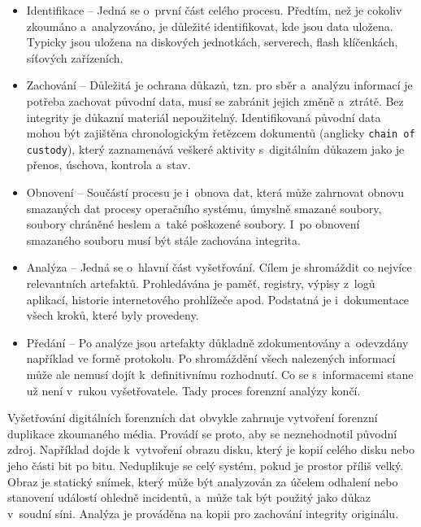 \begin{itemize}
\item Identifikace -- Jedná se o~první část celého procesu. Předtím, než je cokoliv zkoumáno a~analyzováno, je důležité identifikovat, kde jsou data uložena. Typicky jsou uložena na diskových jednotkách, serverech, flash klíčenkách, síťových zařízeních.

\item Zachování -- Důležitá je ochrana důkazů, tzn. pro sběr a~analýzu informací je potřeba zachovat původní data, musí se zabránit jejich změně a~ztrátě. Bez integrity je důkazní materiál nepoužitelný. Identifikovaná původní data mohou být zajištěna chronologickým řetězcem dokumentů (anglicky \texttt{chain of custody}), který zaznamenává veškeré aktivity s~digitálním důkazem jako je přenos, úschova, kontrola a~stav.

\item Obnovení -- Součástí procesu je i~obnova dat, která může zahrnovat obnovu smazaných dat procesy operačního systému, úmyslně smazané soubory, soubory chráněné heslem a~také poškozené soubory. I~po obnovení smazaného souboru musí být stále zachována integrita.

\item Analýza -- Jedná se o~hlavní část vyšetřování. Cílem je shromáždit co nejvíce relevantních artefaktů. Prohledávána je paměť, registry, výpisy z~logů aplikací, historie internetového prohlížeče apod. Podstatná je i~dokumentace všech kroků, které byly provedeny.

\item Předání -- Po analýze jsou artefakty důkladně zdokumentovány a~odevzdány například ve formě protokolu. Po shromáždění všech nalezených informací může ale nemusí dojít k~definitivnímu rozhodnutí. Co se s~informacemi stane už není v~rukou vyšetřovatele. Tady proces forenzní analýzy končí.
\end{itemize}

\noindent Vyšetřování digitálních forenzních dat obvykle zahrnuje vytvoření forenzní duplikace zkoumaného média. Provádí se proto, aby se neznehodnotil původní zdroj. Například dojde k~vytvoření obrazu disku, který je kopií celého disku nebo jeho části bit po bitu. Neduplikuje se celý systém, pokud je prostor příliš velký. Obraz je statický snímek, který může být analyzován za účelem odhalení nebo stanovení událostí ohledně incidentů, a~může tak být použitý jako důkaz v~soudní síni. Analýza je prováděna na kopii pro zachování integrity originálu.

